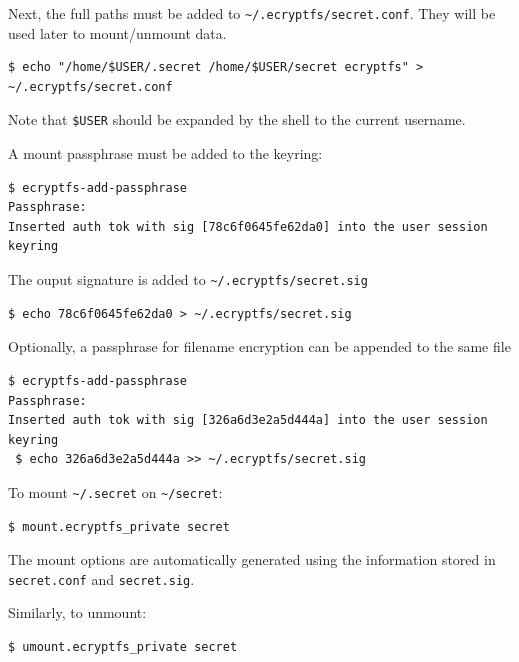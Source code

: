 Next, the full paths must be added to \texttt{\textasciitilde/.ecryptfs/secret.conf}. They will be used later to mount/unmount data.
\begin{lstlisting}[numbers=none]
$ echo "/home/$USER/.secret /home/$USER/secret ecryptfs" > ~/.ecryptfs/secret.conf
\end{lstlisting}
Note that \texttt{\$USER} should be expanded by the shell to the current username.

A mount passphrase must be added to the keyring:
\begin{lstlisting}[numbers=none]
$ ecryptfs-add-passphrase
Passphrase: 
Inserted auth tok with sig [78c6f0645fe62da0] into the user session keyring
\end{lstlisting}

The ouput signature is added to \texttt{\textasciitilde/.ecryptfs/secret.sig}
\begin{lstlisting}[numbers=none]
$ echo 78c6f0645fe62da0 > ~/.ecryptfs/secret.sig
\end{lstlisting}

Optionally, a passphrase for filename encryption can be appended to the same file
\begin{lstlisting}[numbers=none]
$ ecryptfs-add-passphrase
Passphrase: 
Inserted auth tok with sig [326a6d3e2a5d444a] into the user session keyring
 $ echo 326a6d3e2a5d444a >> ~/.ecryptfs/secret.sig
\end{lstlisting}

To mount \texttt{\textasciitilde/.secret} on \texttt{\textasciitilde/secret}:
\begin{lstlisting}[numbers=none]
$ mount.ecryptfs_private secret
\end{lstlisting}
The mount options are automatically generated using the information stored in \texttt{secret.conf} and \texttt{secret.sig}.

Similarly, to unmount:
\begin{lstlisting}[numbers=none]
$ umount.ecryptfs_private secret
\end{lstlisting}
